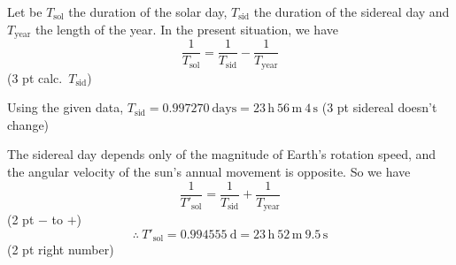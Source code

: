 Let be $T_{\mathrm{sol}}$ the duration of the solar day, $T_{\mathrm{sid}}$
the duration of the sidereal day and $T_{\mathrm{year}}$ the length of the
year. In the present situation, we have
\[
  \frac{1}{T_{\mathrm{sol}}} = \frac{1}{T_{\mathrm{sid}}}
    - \frac{1}{T_{\mathrm{year}}}
\]
\hfill(3 pt calc.\ $T_{\mathrm{sid}}$)

Using the given data,
$T_{\mathrm{sid}} = 0.997270\ \mathrm{days}
= 23\,\mathrm{h}\ 56\,\mathrm{m}\ 4\,\mathrm{s}$
\hfill(3 pt sidereal doesn't change)

The sidereal day depends only of the magnitude of Earth's rotation speed, and
the angular velocity of the sun's annual movement is opposite. So we have
\[
  \frac{1}{T'_{\mathrm{sol}}} = \frac{1}{T_{\mathrm{sid}}}
    + \frac{1}{T_{\mathrm{year}}}
\]
\hfill(2 pt $-$ to $+$)
\[
  \therefore\ T'_{\mathrm{sol}} = 0.994555\ \mathrm{d}
    = 23\,\mathrm{h}\ 52\,\mathrm{m}\ 9.5\,\mathrm{s}
\]
\hfill(2 pt right number)

